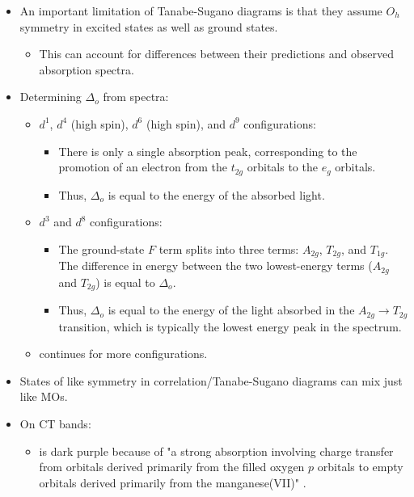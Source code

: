 \documentclass[../notes.tex]{subfiles}
\begin{document}
\begin{itemize}
\begin{itemize}
    \end{itemize}
    \item An important limitation of Tanabe-Sugano diagrams is that they assume $O_h$ symmetry in excited states as well as ground states.
    \begin{itemize}
        \item This can account for differences between their predictions and observed absorption spectra.
    \end{itemize}
    \item Determining $\Delta_o$ from spectra:
    \begin{itemize}
        \item $d^1$, $d^4$ (high spin), $d^6$ (high spin), and $d^9$ configurations:
        \begin{itemize}
            \item There is only a single absorption peak, corresponding to the promotion of an electron from the $t_{2g}$ orbitals to the $e_g$ orbitals.
            \item Thus, $\Delta_o$ is equal to the energy of the absorbed light.
        \end{itemize}
        \item $d^3$ and $d^8$ configurations:
        \begin{itemize}
            \item The ground-state $F$ term splits into three terms: $A_{2g}$, $T_{2g}$, and $T_{1g}$. The difference in energy between the two lowest-energy terms ($A_{2g}$ and $T_{2g}$) is equal to $\Delta_o$.
            \item Thus, $\Delta_o$ is equal to the energy of the light absorbed in the $A_{2g}\to T_{2g}$ transition, which is typically the lowest energy peak in the spectrum.
        \end{itemize}
        \item \textcite{bib:MiesslerFischerTarr} continues for more configurations.
    \end{itemize}
    \item States of like symmetry in correlation/Tanabe-Sugano diagrams can mix just like MOs.
    \item On CT bands:
    \begin{itemize}
        \item {} is dark purple because of "a strong absorption involving charge transfer from orbitals derived primarily from the filled oxygen $p$ orbitals to empty orbitals derived primarily from the manganese(VII)" \parencite[430]{bib:MiesslerFischerTarr}.

\end{itemize}
\end{itemize}
\end{document}
